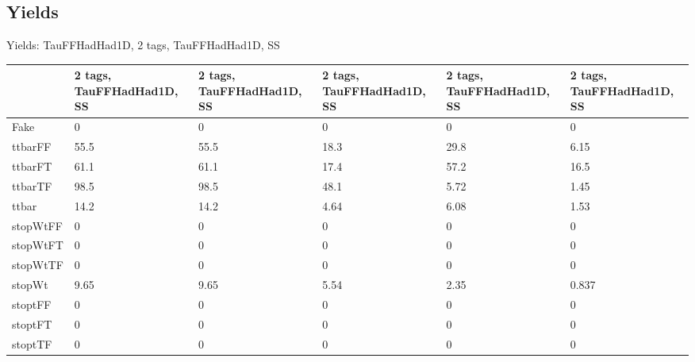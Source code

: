 
\subsection{Yields}

\begin{frame}{Yields: TauFFHadHad1D, 2 tags, TauFFHadHad1D, SS}
\begin{center}
  \begin{tabular}{l| >{\centering\let\newline\\\arraybackslash\hspace{0pt}}m{1.4cm}| >{\centering\let\newline\\\arraybackslash\hspace{0pt}}m{1.4cm}| >{\centering\let\newline\\\arraybackslash\hspace{0pt}}m{1.4cm}| >{\centering\let\newline\\\arraybackslash\hspace{0pt}}m{1.4cm}| >{\centering\let\newline\\\arraybackslash\hspace{0pt}}m{1.4cm}}
    & 2 tags, TauFFHadHad1D, SS & 2 tags, TauFFHadHad1D, SS & 2 tags, TauFFHadHad1D, SS & 2 tags, TauFFHadHad1D, SS & 2 tags, TauFFHadHad1D, SS \\
 \hline \hline
    Fake& 0 & 0 & 0 & 0 & 0 \\
 \hline
    ttbarFF& 55.5 & 55.5 & 18.3 & 29.8 & 6.15 \\
 \hline
    ttbarFT& 61.1 & 61.1 & 17.4 & 57.2 & 16.5 \\
 \hline
    ttbarTF& 98.5 & 98.5 & 48.1 & 5.72 & 1.45 \\
 \hline
    ttbar& 14.2 & 14.2 & 4.64 & 6.08 & 1.53 \\
 \hline
    stopWtFF& 0 & 0 & 0 & 0 & 0 \\
 \hline
    stopWtFT& 0 & 0 & 0 & 0 & 0 \\
 \hline
    stopWtTF& 0 & 0 & 0 & 0 & 0 \\
 \hline
    stopWt& 9.65 & 9.65 & 5.54 & 2.35 & 0.837 \\
 \hline
    stoptFF& 0 & 0 & 0 & 0 & 0 \\
 \hline
    stoptFT& 0 & 0 & 0 & 0 & 0 \\
 \hline
    stoptTF& 0 & 0 & 0 & 0 & 0 \\

\end{tabular}
\end{center}
\end{frame}
